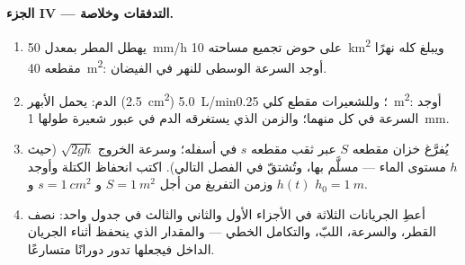 \begin{problem}
\medskip
\noindent\textbf{الجزء IV --- التدفقات وخلاصة.}
\begin{enumerate}[resume]
  \item يهطل المطر بمعدل \qty{50}{mm/h} على حوض تجميع مساحته
        \qty{10}{km^2} ويبلغ كله نهرًا مقطعه \qty{40}{m^2}: أوجد
        السرعة الوسطى للنهر في الفيضان.
  \item الدم: يحمل الأبهر (\qty{2.5}{cm^2}) \qty{5.0}{L/min}؛
        وللشعيرات مقطع كلي \qty{0.25}{m^2}: أوجد السرعة في كل
        منهما؛ والزمن الذي يستغرقه الدم في عبور شعيرة طولها \qty{1}{mm}.
  \item يُفرَّغ خزان مقطعه $S$ عبر ثقب مقطعه $s$ في أسفله؛
        وسرعة الخروج $\sqrt{2gh}$ (حيث $h$ مستوى الماء --- مسلَّم
        بها، وتُشتقّ في الفصل التالي). اكتب انحفاظ الكتلة وأوجد
        $h(t)$ وزمن التفريغ من أجل
        $S = \qty{1}{m^2}$ و $s = \qty{1}{cm^2}$ و $h_0 = \qty{1}{m}$.
  \item أعطِ الجريانات الثلاثة في الأجزاء الأول والثاني والثالث في جدول واحد:
        نصف القطر، والسرعة،  اللبّ، والتكامل الخطي ---
        والمقدار الذي ينحفظ أثناء الجريان الداخل فيجعلها تدور
        دورانًا متسارعًا.
\end{enumerate}
\end{problem}
